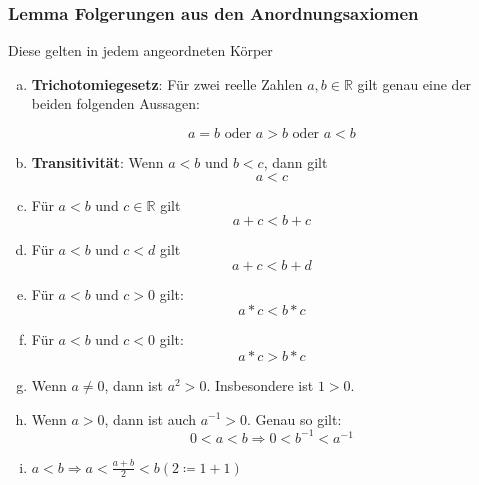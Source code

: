 \documentclass{article}
\begin{document}
\subsubsection{Lemma Folgerungen aus den Anordnungsaxiomen}

Diese gelten in jedem angeordneten Körper

\begin{enumerate}[(a)]
\item \textbf{Trichotomiegesetz}: Für zwei reelle Zahlen $a, b \in \mathbb{R}$ gilt genau eine der beiden folgenden
  Aussagen:

  \[
    a = b \text{ oder } a > b \text{ oder } a < b
  \]
\item \textbf{Transitivität}: Wenn $a < b$ und $b < c$, dann gilt
  \[
    a < c
  \]
\item Für $a < b$ und $c \in \mathbb{R}$ gilt
  \[
    a + c < b + c
  \]
\item Für $a < b$ und $c < d$ gilt
  \[
    a + c < b + d
  \]
\item Für $a < b$ und $c > 0$ gilt:
  \[
    a * c < b * c
  \]
\item Für $a < b$ und $c < 0$ gilt:
  \[
    a * c > b * c
  \]
\item Wenn $a \ne 0$, dann ist $a^2 > 0$. Insbesondere ist $1 > 0$.
\item Wenn $a > 0$, dann ist auch $a^{-1} > 0$. Genau so gilt:
  \[
    0 < a < b \Rightarrow 0 < b^{-1} < a^{-1}
  \]
\item $a < b \Rightarrow a < \frac{a + b}{2} < b (2 \coloneqq 1 + 1)$ 
\end{enumerate}
\end{document}
